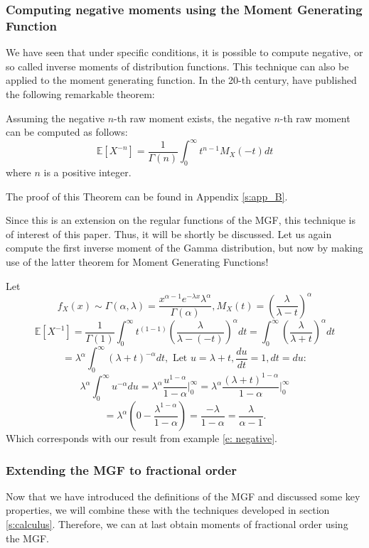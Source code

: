 \subsubsection{Computing negative moments using the Moment Generating Function}
We have seen that under specific conditions, it is possible to compute negative, or so called inverse moments of distribution functions. This technique can also be applied to the moment generating function. In the 20-th century, \cite{cressie1981} have published the following remarkable theorem:

\begin{theorem}\label{t: negative}
    Assuming the negative \(n\)-th raw moment exists, the negative \(n\)-th raw moment can be computed as follows: 
    \[\mathbb{E}[X^{-n}] = \frac{1}{\Gamma(n)} \int_{0}^{\infty} t^{n- 1} M_X(-t) dt\] where \(n\) is a positive integer.
\end{theorem}
The proof of this Theorem can be found in Appendix \ref{s:app_B}.

Since this is an extension on the regular functions of the MGF, this technique is of interest of this paper. Thus, it will be shortly be discussed. Let us again compute the first inverse moment of the Gamma distribution, but now by making use of the latter theorem for Moment Generating Functions!

\begin{example}
    Let \[f_X(x) \sim \Gamma(\alpha, \lambda) = 
    \frac{x^{\alpha -1} e^{-\lambda x} \lambda^\alpha} {\Gamma(\alpha)}, M_X(t) = \left(\frac{\lambda}{\lambda - t}\right)^\alpha\]
    \[\mathbb{E}[X^{-1}] = \frac{1}{\Gamma(1)} \int_{0}^{\infty} t^{( 1 - 1)} \left(\frac{\lambda}{\lambda - (-t)}\right)^\alpha dt =  \int_{0}^{\infty} \left(\frac{\lambda}{\lambda + t}\right)^\alpha dt\]
    \[ = \lambda^\alpha \int_{0}^{\infty} (\lambda + t)^{-\alpha} dt, \text{ Let } u = \lambda + t, \frac{du}{dt} = 1, dt = du:\]
    \[ \lambda^\alpha \int_{0}^{\infty} u^{-\alpha} du
    =  \lambda^\alpha \frac{u^{ 1-\alpha}}{1 -\alpha}\Big|_{0}^{\infty} = \lambda^\alpha \frac{(\lambda + t)^{1 -\alpha}}{1 -\alpha}\Big|_{0}^{\infty}\]
    \[= \lambda^\alpha\left( 0 - \frac{\lambda^{ 1 - \alpha}}{1 -\alpha}\right) = \frac{-\lambda}{ 1 - \alpha} = \frac{\lambda}{\alpha - 1}.\] Which corresponds with our result from example \ref{e: negative}.
\end{example}

\subsubsection{Extending the MGF to fractional order}
Now that we have introduced the definitions of the MGF and discussed some key properties, we will combine these with the techniques developed in section \ref{s:calculus}. Therefore, we can at last obtain moments of fractional order using the MGF.


